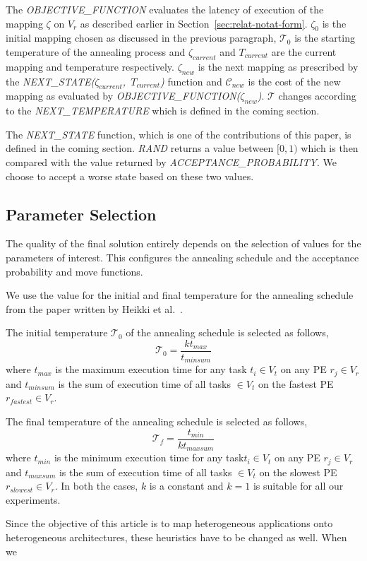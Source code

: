 The \textit{OBJECTIVE\_FUNCTION} evaluates the latency of execution of
the mapping $\zeta$ on $V_r$ as described earlier in
Section~\ref{sec:relat-notat-form}. $\zeta_0$ is the initial mapping
chosen as discussed in the previous paragraph, $\mathcal{T}_0$ is the
starting temperature of the annealing process and $\zeta_{current}$ and
$T_{current}$ are the current mapping and temperature
respectively. $\zeta_{new}$ is the next mapping as prescribed by the
\mbox{\textit{NEXT\_STATE($\zeta_{current}$, $T_{current}$)}} function
and $\mathcal{C}_{new}$ is the cost of the new mapping as evaluated by
\textit{OBJECTIVE\_FUNCTION($\zeta_{new}$)}. $\mathcal{T}$ changes
according to the \textit{NEXT\_TEMPERATURE} which is defined in the
coming section.

The \textit{NEXT\_STATE} function, which is one of the contributions of
this paper, is defined in the coming section. \textit{RAND} returns a
value between $[0, 1)$ which is then compared with the value returned by
\textit{ACCEPTANCE\_PROBABILITY}. We choose to accept a worse state
based on these two values.

\subsection{Parameter Selection}
The quality of the final solution entirely depends on the selection of values
for the parameters of interest. This configures the annealing schedule and the
acceptance probability and move functions.

We use the value for the initial and final temperature for the annealing
schedule from the paper written by Heikki et al.~\cite{hors06}.

The initial temperature $\mathcal{T}_0$ of the annealing schedule is selected as follows,
\begin{equation}
\mathcal{T}_0 = \frac{kt_{max}}{t_{minsum}}
\end{equation}
where $t_{max}$ is the maximum execution time for any task $t_i \in V_t$ on any
PE $r_j \in V_r$ and $t_{minsum}$ is the sum of execution time of all tasks $\in
V_t$ on the fastest PE $r_{fastest} \in V_r$.

The final temperature of the annealing schedule is selected as follows,
\begin{equation}
\mathcal{T}_f = \frac{t_{min}}{kt_{maxsum}}
\end{equation}
where $t_{min}$ is the minimum execution time for any task$t_i \in V_t$ on any
PE $r_j \in V_r$ and $t_{maxsum}$ is the sum of execution time of all tasks $\in
V_t$ on the slowest PE $r_{slowest} \in V_r$. In both the cases, $k$ is a
constant and $k=1$ is suitable for all our experiments.

Since the objective of this article is to map heterogeneous applications
onto heterogeneous architectures, these heuristics have to be changed as
well. When we

